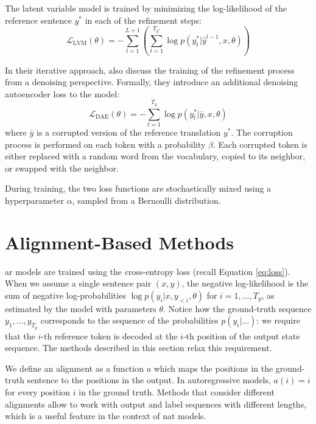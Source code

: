 The latent variable model is trained by minimizing the log-likelihood of the
reference sentence $y^*$ in each of the refinement steps:
\begin{equation}
  \mathcal{L}_{\text{LVM}}(\theta) = - \sum_{l=1}^{L+1} \left(
    \sum_{t=1}^{T_{y^*}} \log p(y_t^* | \hat{y}^{l-1}, x, \theta)
  \right) \label{eq:refinement-lvm-loss}
\end{equation}

In their iterative approach, \citet{lee-etal-2018-deterministic} also discuss
the training of the refinement process from a denoising perspective. Formally,
they introduce an additional denoising autoencoder loss to the model:
%
\begin{equation}
  \mathcal{L}_{\text{DAE}}(\theta) = - \sum_{t=1}^{T_y} \log p(y_t^* | \bar{y}, x, \theta)
\end{equation}
where $\bar{y}$ is a corrupted version of the reference translation $y^*$. The
corruption process is performed on each token with a probability $\beta$. Each
corrupted token is either replaced with a random word from the vocabulary,
copied to its neighbor, or swapped with the neighbor.

During training, the two loss functions are stochastically mixed using a
hyperparameter $\alpha$, sampled from a Bernoulli distribution.


\section{Alignment-Based Methods}%
\label{sec:nat:alignment}

\Acl{ar} models are trained using the cross-entropy loss (recall Equation
\ref{eq:loss}). When we assume a single sentence pair $(x,y)$, the negative
log-likelihood is the sum of negative log-probabilities
$\log p(y_i|x, y_{<i}, \theta)$ for $i=1, \ldots, T_y$, as estimated by the
model with parameters $\theta$.  Notice how the ground-truth sequence
$y_1, \ldots, y_{T_y}$ corresponds to the sequence of the probabilities
$p(y_i|\ldots)$: we require that the $i$-th reference token is decoded at the
$i$-th position of the output state sequence. The methods described in this
section relax this requirement.

We define an alignment as a function $a$ which maps the positions in the
ground-truth sentence to the positions in the output. In autoregressive
models, $a(i) = i$ for every position $i$ in the ground truth. %
Methods that consider different alignments allow to work with output and label
sequences with different lengths, which is a useful feature in the context of
\ac{nat} models.

